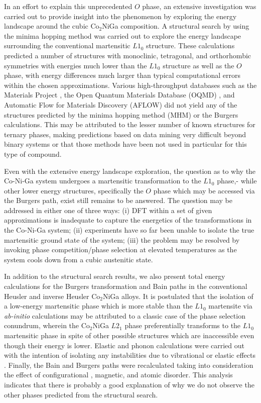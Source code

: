 \documentclass[%
preprint,
 amsmath,amssymb,
 aps,
prb,
showkeys,
]{revtex4-1}
\begin{document}
In an effort to explain this unprecedented $O$ phase, an extensive investigation was carried out to provide insight into the phenomenon by exploring the energy landscape around the cubic Co$_2$NiGa composition. A structural search by using the minima hopping method\cite{Goedecker2004} was carried out to explore the energy landscape surrounding the conventional martensitic $L1_0$ structure.  These calculations predicted a number of structures with monoclinic, tetragonal, and orthorhombic symmetries with energies much lower than the $L1_0$ structure as well as the $O$ phase, with energy differences much larger than typical computational errors within the chosen approximations. Various high-throughput databases such as the Materials Project \cite{Materialsproject}, the Open Quantum Materials Database (OQMD) \cite{OQMD}, and Automatic Flow for Materials Discovery (AFLOW) \cite{curtarolo2009aflow} did not yield any of the structures predicted by the minima hopping method (MHM) or the Burgers calculations. This may be attributed to the lesser number of known structures for ternary phases, making predictions based on data mining very difficult beyond binary systems or that those methods have been not used in particular for this type of compound.

Even with the extensive energy landscape exploration, the question as to why the Co-Ni-Ga system undergoes a martensitic transformation to the $L1_0$  phase,- while other lower energy structures, specifically the $O$ phase which may be accessed via the Burgers path, exist still remains to be answered. The question may be addressed in either one of three ways: (i) DFT  within a set of given approximations is inadequate to capture the energetics of the transformations in the  Co-Ni-Ga system; (ii) experiments  have so far been unable to isolate the true  martensitic ground state of the system; (iii) the problem may be resolved by invoking phase competition/phase selection at elevated temperatures as the system cools down from a cubic austenitic state.

In addition to the structural search results, we also present total energy calculations for the Burgers transformation and Bain paths in the conventional Heusler and inverse Heusler Co$_2$NiGa  alloys. It is postulated that the isolation of a low-energy martensitic phase which is more stable than the $L1_0$ martensite via \textit{ab-initio} calculations may be attributed to a classic case of the phase selection conundrum, wherein the Co$_2$NiGa $L2_1$ phase preferentially transforms to the $L1_0$ martensitic phase in spite of other possible structures  which are inaccessible even though their energy is lower. Elastic and phonon calculations  were carried out with the intention of isolating any instabilities due to vibrational or elastic effects .  Finally, the Bain and Burgers paths were recalculated taking into consideration the effect of configurational , magnetic, and atomic disorder. This analysis indicates that there is probably a good explanation  of why we do not  observe the other phases  predicted from the structural 
search.
\end{document}
